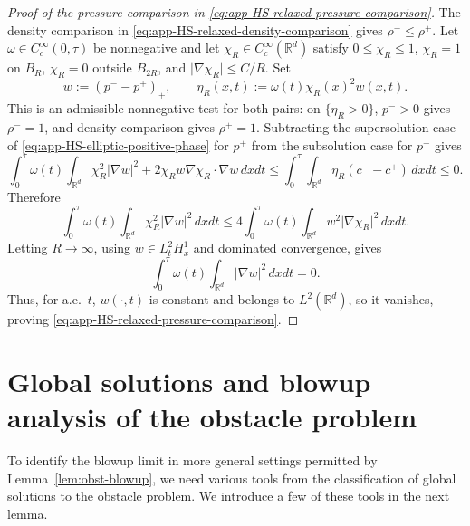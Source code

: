 \documentclass[11pt]{amsart}
\numberwithin{equation}{section}
\numberwithin{figure}{section}
\theoremstyle{plain}
\theoremstyle{definition}
\theoremstyle{remark}
\theoremstyle{plain}
\newcommand{\abs}[1]{\lvert #1 \rvert}
\def\R{\mathbb{R}}
\begin{document}
\begin{proof}[Proof of the pressure comparison in \eqref{eq:app-HS-relaxed-pressure-comparison}]
The density comparison in \eqref{eq:app-HS-relaxed-density-comparison} gives
\(\rho^-\leq\rho^+\).  Let \(\omega\in C_c^\infty(0,\tau)\) be nonnegative and
let \(\chi_R\in C_c^\infty(\R^d)\) satisfy \(0\leq\chi_R\leq1\),
\(\chi_R=1\) on \(B_R\), \(\chi_R=0\) outside \(B_{2R}\), and
\(\abs{\nabla\chi_R}\leq C/R\).  Set
\[
    w:=(p^- -p^+)_+,
    \qquad
    \eta_R(x,t):=\omega(t)\chi_R(x)^2w(x,t).
\]
This is an admissible nonnegative test for both pairs: on
\(\{\eta_R>0\}\), \(p^->0\) gives \(\rho^-=1\), and density comparison gives
\(\rho^+=1\).
Subtracting the supersolution case of
\eqref{eq:app-HS-elliptic-positive-phase} for \(p^+\) from the subsolution
case for \(p^-\) gives
\[
    \int_0^\tau \omega(t)\int_{\R^d}
    \chi_R^2\abs{\nabla w}^2
    +2\chi_Rw\nabla\chi_R\cdot\nabla w\,dxdt
    \leq
    \int_0^\tau\!\!\int_{\R^d}\eta_R(c^- -c^+)\,dxdt
    \leq0 .
\]
Therefore
\[
    \int_0^\tau \omega(t)\int_{\R^d}
    \chi_R^2\abs{\nabla w}^2\,dxdt
    \leq
    4\int_0^\tau \omega(t)\int_{\R^d}w^2\abs{\nabla\chi_R}^2\,dxdt .
\]
Letting \(R\to\infty\), using \(w\in L^2_tH^1_x\) and dominated
convergence, gives
\[
    \int_0^\tau \omega(t)\int_{\R^d}\abs{\nabla w}^2\,dxdt=0.
\]
Thus, for a.e.\ \(t\), \(w(\cdot,t)\) is constant and belongs to
\(L^2(\R^d)\), so it vanishes, proving
\eqref{eq:app-HS-relaxed-pressure-comparison}.
\end{proof}

\section{Global solutions and blowup analysis of the obstacle problem}\label{app:global-obstacle}


To identify the blowup limit in more general settings permitted by Lemma~\ref{lem:obst-blowup}, we need various tools from the classification of global solutions to the obstacle problem. We introduce a few of these tools in the next lemma.
\end{document}
